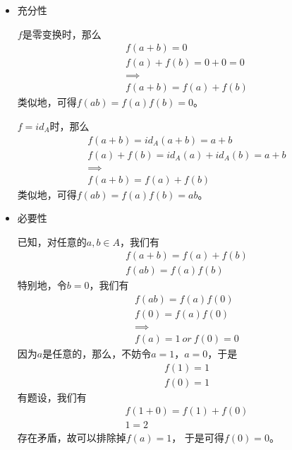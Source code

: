 \documentclass{article}
\begin{document}
\begin{itemize}
      \item 充分性

            $f$是零变换时，那么
            \begin{align*}
                  f(a + b) = 0            \\
                  f(a) + f(b) = 0 + 0 = 0 \\
                  \implies                \\
                  f(a + b) = f(a) + f(b)
            \end{align*}
            类似地，可得$f(ab) = f(a)f(b) = 0$。

            $f = id_A$时，那么
            \begin{align*}
                  f(a + b) = id_A(a + b) = a + b          \\
                  f(a) + f(b) = id_A(a) + id_A(b) = a + b \\
                  \implies                                \\
                  f(a + b) = f(a) + f(b)
            \end{align*}
            类似地，可得$f(ab) = f(a)f(b) = ab$。

      \item 必要性

            已知，对任意的$a, b \in A$，我们有
            \begin{align*}
                  f(a + b) = f(a) + f(b) \\
                  f(ab) = f(a)f(b)
            \end{align*}
            特别地，令$b = 0$，我们有
            \begin{align*}
                  f(ab) = f(a) f(0) \\
                  f(0) = f(a) f(0)  \\
                  \implies          \\
                  f(a) = 1 \ or \ f(0) = 0
            \end{align*}
            因为$a$是任意的，那么，不妨令$a = 1$，$a = 0$，于是
            \begin{align*}
                  f(1) = 1 \\
                  f(0) = 1
            \end{align*}
            有题设，我们有
            \begin{align*}
                  f(1 + 0) = f(1) + f(0) \\
                  1 = 2
            \end{align*}
            存在矛盾，故可以排除掉$f(a) = 1$，
            于是可得$f(0) = 0$。


\end{itemize}
\end{document}
